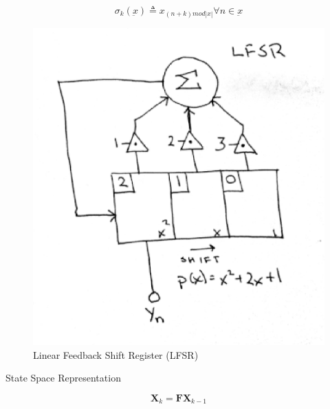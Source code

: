 \begin{equation}
\sigma_k \left( \underbar{x} \right)
\triangleq
x_{\left( n + k \right) mod |x|} \forall n \in \underbar{x}
\label{eq:rotate}
\end{equation}

\begin{figure}[H]
\begin{center}
\includegraphics{./figures/lfsr-2.eps}
\end{center}
\caption{Linear Feedback Shift Register (LFSR)}
\label{fig:lfsr}
\end{figure}

State Space Representation
\newline

\begin{equation}
\mathbf{X}_k = \mathbf{F}\mathbf{X}_{k-1}
\label{eq:ss_rep}
\end{equation}

